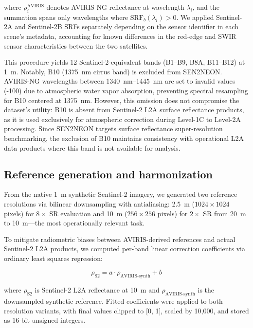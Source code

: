 \documentclass[journal]{IEEEtran}
\begin{document}
        where $\rho_i^{\text{AVIRIS}}$ denotes AVIRIS-NG reflectance at wavelength $\lambda_i$, and the summation spans only wavelengths where $\text{SRF}_b(\lambda_i) > 0$. We applied Sentinel-2A and Sentinel-2B SRFs separately depending on the sensor identifier in each scene's metadata, accounting for known differences in the red-edge and SWIR sensor characteristics between the two satellites.
        
        This procedure yields 12 Sentinel-2-equivalent bands (B1--B9, B8A, B11--B12) at \SI{1}{m}. Notably, B10 (\SI{1375}{nm} cirrus band) is excluded from SEN2NEON. AVIRIS-NG wavelengths between \SI{1340}{nm}--\SI{1445}{nm} are set to invalid values (-100) due to atmospheric water vapor absorption, preventing spectral resampling for B10 centered at \SI{1375}{nm}. However, this omission does not compromise the dataset's utility: B10 is absent from Sentinel-2 L2A surface reflectance products, as it is used exclusively for atmospheric correction during Level-1C to Level-2A processing. Since SEN2NEON targets surface reflectance super-resolution benchmarking, the exclusion of B10 maintains consistency with operational L2A data products where this band is not available for analysis.
    
    
     \subsection{Reference generation and harmonization}
    
        From the native \SI{1}{m} synthetic Sentinel-2 imagery, we generated two reference resolutions via bilinear downsampling with antialiasing: \SI{2.5}{m} ($1024\times1024$ pixels) for $8\times$ SR evaluation and \SI{10}{m} ($256\times256$ pixels) for $2\times$ SR from \SI{20}{m} to \SI{10}{m}---the most operationally relevant task.
        
        To mitigate radiometric biases between AVIRIS-derived references and actual Sentinel-2 L2A products, we computed per-band linear correction coefficients via ordinary least squares regression:
        
        \begin{equation}
        \rho_{\text{S2}} = a \cdot \rho_{\text{AVIRIS-synth}} + b
        \end{equation}
        
        where $\rho_{\text{S2}}$ is Sentinel-2 L2A reflectance at \SI{10}{m} and $\rho_{\text{AVIRIS-synth}}$ is the downsampled synthetic reference. Fitted coefficients were applied to both resolution variants, with final values clipped to [0, 1], scaled by 10,000, and stored as 16-bit unsigned integers.
            
\end{document}
